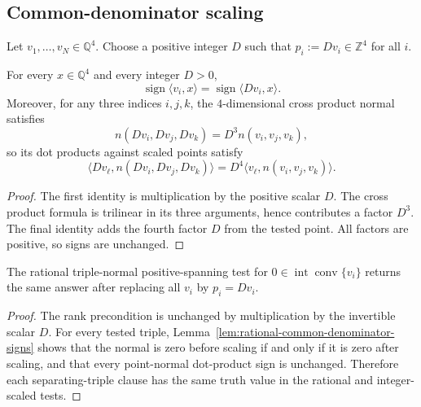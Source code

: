 %
%

\subsection{Common-denominator scaling}

Let $v_1,\ldots,v_N \in \mathbb{Q}^4$.  Choose a positive integer $D$
such that $p_i := Dv_i \in \mathbb{Z}^4$ for all $i$.

\begin{lemma}
\label{lem:rational-common-denominator-signs}
For every $x \in \mathbb{Q}^4$ and every integer $D > 0$,
\[
  \operatorname{sign}\langle v_i,x\rangle
  =
  \operatorname{sign}\langle Dv_i,x\rangle .
\]
Moreover, for any three indices $i,j,k$, the $4$-dimensional cross product
normal satisfies
\[
  n(Dv_i,Dv_j,Dv_k) = D^3 n(v_i,v_j,v_k),
\]
so its dot products against scaled points satisfy
\[
  \langle Dv_\ell,n(Dv_i,Dv_j,Dv_k)\rangle
  =
  D^4\langle v_\ell,n(v_i,v_j,v_k)\rangle .
\]
\end{lemma}

\begin{proof}
The first identity is multiplication by the positive scalar $D$.  The cross
product formula is trilinear in its three arguments, hence contributes a factor
$D^3$.  The final identity adds the fourth factor $D$ from the tested point.
All factors are positive, so signs are unchanged.
\end{proof}

\begin{lemma}
\label{lem:integer-scaled-origin-interior-test}
The rational triple-normal positive-spanning test for
$0 \in \operatorname{int}\operatorname{conv}\{v_i\}$ returns the same answer
after replacing all $v_i$ by $p_i = Dv_i$.
\end{lemma}

\begin{proof}
The rank precondition is unchanged by multiplication by the invertible scalar
$D$.  For every tested triple, Lemma~\ref{lem:rational-common-denominator-signs}
shows that the normal is zero before scaling if and only if it is zero after
scaling, and that every point-normal dot-product sign is unchanged.  Therefore
each separating-triple clause has the same truth value in the rational and
integer-scaled tests.
\end{proof}

